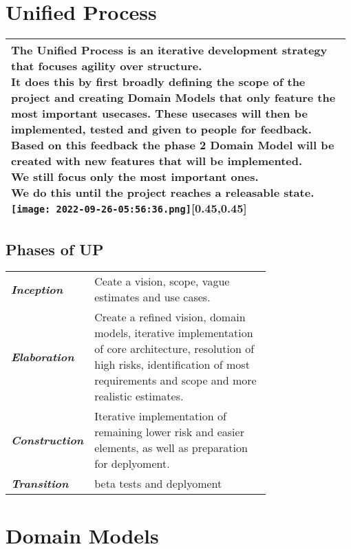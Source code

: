 \documentclass[main.tex,fontsize=8pt,paper=a4,paper=portrait,DIV=calc,]{scrartcl}
\begin{document}
\begin{table}[h!]
\section{Unified Process}
\begin{tabular}{|m{0.975\linewidth}|}
\hline
\minipg{
The Unified Process is an iterative development strategy that focuses agility over structure.\newline
It does this by first broadly defining the scope of the project and creating Domain Models that only feature the most important usecases.
These usecases will then be implemented, tested and given to people for feedback.\newline
Based on this feedback the phase 2 Domain Model will be created with new features that will be implemented.\newline We still focus only the most important ones.\newline
We do this until the project reaches a releasable state. \\}
{\texttt{[image: 2022-09-26-05:56:36.png]}}[0.45,0.45]\\
\hline
\end{tabular}
\subsection{Phases of UP}
\begin{tabular}{|m{0,205\linewidth}|m{0.75\linewidth}|}
\hline
\textbf{\emph{Inception}} & Ceate a vision, scope, vague estimates and use cases.\\
\textbf{\emph{Elaboration}} & Create a refined vision, domain models, iterative implementation of core architecture, resolution of high risks, identification of most requirements and scope and more realistic estimates.\\
\textbf{\emph{Construction}} & Iterative implementation of remaining lower risk and easier elements, as well as preparation for deplyoment.\\
\textbf{\emph{Transition}} &beta tests and deplyoment \\
\hline
\end{tabular}
\section{Domain Models}

\end{table}
\end{document}
